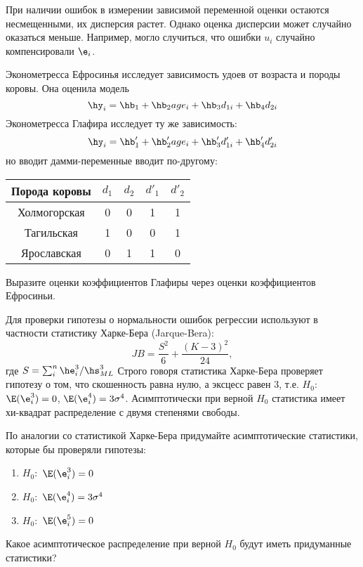 \documentclass[pdftex,11pt,openany]{book}\usepackage[]{graphicx}\usepackage[]{color}
\begin{document}
\begin{solution}
При наличии ошибок в измерении зависимой переменной оценки остаются несмещенными, их дисперсия растет. Однако оценка дисперсии может случайно оказаться меньше. Например, могло случиться, что ошибки $u_i$ случайно компенсировали $\e_i$. 
\end{solution}

\begin{problem}
Эконометресса Ефросинья исследует зависимость удоев от возраста и породы коровы. Она оценила модель 
\[
\hy_i = \hb_1 + \hb_2 age_i +\hb_3 d_{1i} + \hb_4 d_{2i} 
\]
Эконометресса Глафира исследует ту же зависимость:
\[
\hy_i = \hb'_1 + \hb'_2 age_i +\hb'_3 d'_{1i} + \hb'_4 d'_{2i} 
\]
но вводит дамми-переменные вводит по-другому:

\begin{tabular}{c|cccc}
Порода коровы & $d_1$ & $d_2$ & $d'_1$ & $d'_2$  \\ 
\hline 
Холмогорская & 0 & 0 & 1 & 1 \\ 
Тагильская & 1 & 0 & 0 & 1  \\ 
Ярославская & 0 & 1 & 1 & 0  \\ 
\hline 
\end{tabular} 

Выразите оценки коэффициентов Глафиры через оценки коэффициентов Ефросиньи.
\end{problem}

\begin{solution}
\end{solution}

\begin{problem}
Для проверки гипотезы о нормальности ошибок регрессии используют в частности статистику Харке-Бера (Jarque-Bera):
\[
JB=\frac{S^2}{6} + \frac{(K-3)^2}{24},
\]
где $S=\sum_i^n \he_i^3 /\hs^3_{ML}$ 
Строго говоря статистика Харке-Бера проверяет гипотезу о том, что скошенность равна нулю, а эксцесс равен 3, т.е. $H_0:$ $\E(\e_i^3)=0$, $\E(\e_i^4)=3\sigma^4$. Асимптотически при верной $H_0$ статистика имеет хи-квадрат распределение с двумя степенями свободы.

По аналогии со статистикой Харке-Бера придумайте асимптотические статистики, которые бы проверяли гипотезы:
\begin{enumerate}
\item $H_0:$ $\E(\e_i^3)=0$
\item $H_0:$ $\E(\e_i^4)=3\sigma^4$
\item $H_0:$ $\E(\e_i^5)=0$
\end{enumerate}
Какое асимптотическое распределение при верной $H_0$ будут иметь придуманные статистики?
\end{problem}
\end{document}
